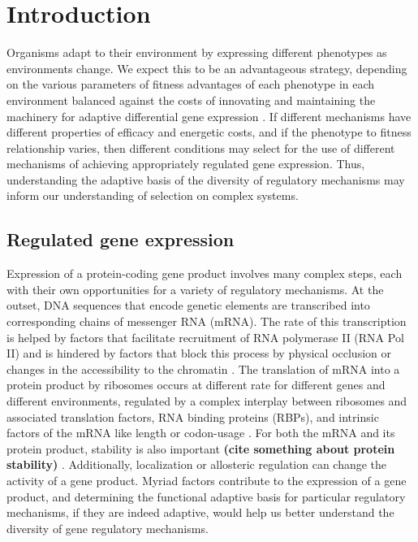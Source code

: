 \chapter{Introduction}

Organisms adapt to
their environment by expressing different phenotypes as environments
change. We expect this to be an advantageous strategy, depending on
the various parameters of fitness advantages of each phenotype in each
environment balanced against the costs of innovating and maintaining
the machinery for adaptive differential gene expression
\parencite{kussell2005phenotypic}. 
If different mechanisms have different properties of
efficacy and energetic costs, and if the phenotype to fitness
relationship varies, then different conditions may select
for the use of different mechanisms of achieving appropriately
regulated gene expression.
Thus, understanding the adaptive basis of the diversity of 
regulatory mechanisms may inform our understanding of selection 
on complex systems.

\section{Regulated gene expression} 

Expression of a protein-coding gene
product involves many complex steps, each with their own opportunities
for a variety of regulatory mechanisms. At the outset, DNA sequences
that encode genetic elements are transcribed into corresponding chains
of messenger RNA (mRNA). The rate of this transcription is helped by
factors that facilitate recruitment of RNA polymerase II (RNA Pol II)
and is hindered by factors that block this process by physical
occlusion or changes in the accessibility to the chromatin 
\parencite{hahn2011transcriptional}. 
The translation of mRNA into a protein product by
ribosomes occurs at different rate for different genes and different
environments, regulated by a complex interplay between ribosomes and
associated translation factors, RNA binding proteins (RBPs), and
intrinsic factors of the mRNA like length or codon-usage 
\parencite{dever2016mechanism}. 
For both the mRNA and its protein product, stability is also
important 
\textbf{(cite something about protein stability)} 
\parencite{perez2013eukaryotic}. 
Additionally, localization or allosteric regulation can change
the activity of a gene product. Myriad factors contribute to the
expression of a gene product, and determining the functional adaptive
basis for particular regulatory mechanisms, if they are indeed
adaptive, would help us better understand the diversity of gene
regulatory mechanisms.

